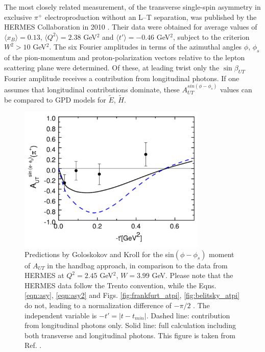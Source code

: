 The most closely related measurement, of the transverse single-spin asymmetry
in exclusive $\pi^+$ electroproduction without an L--T separation, was
published by the HERMES Collaboration in 2010 \cite{hermes10}.  Their data were
obtained for average values of $\langle x_B \rangle =0.13$, $\langle Q^2 \rangle
=2.38$ GeV$^2$ and $\langle t' \rangle = -0.46$ GeV$^2$, subject to the
criterion $W^2>10$ GeV$^2$.  The six Fourier amplitudes in terms of the
azimuthal angles $\phi$, $\phi_s$ of the pion-momentum and proton-polarization
vectors relative to the lepton scattering plane were determined.  Of these, at
leading twist only the $\sin\beta_{UT}$ Fourier amplitude receives a
contribution from longitudinal photons.  If one assumes that longitudinal
contributions dominate, these $A_{UT}^{sin(\phi-\phi_s)}$ values can be
compared to GPD models for $\tilde{E}$, $\tilde{H}$.

\begin{figure}[hbt!]
\begin{center}
\includegraphics[height=7cm]{./figures/hermes_Aut.pdf}
\end{center}
\caption{\label{fig:hermes_aut}
\footnotesize{
Predictions by Goloskokov and Kroll for the sin$(\phi-\phi_s)$ moment of
$A_{UT}$ in the handbag approach, in comparison to the data from HERMES at
$Q^2=2.45$ GeV$^2$, $W=3.99$ GeV.  Please note that the HERMES data
follow the Trento convention, while the Eqns. \ref{eqn:asy}, \ref{eqn:asy2} and
Figs. \ref{fig:frankfurt_atpi}, \ref{fig:belitsky_atpi} do not, leading to a
normalization difference of $-\pi/2$ \cite{hermes-thesis}.  The independent
variable is $-t'=|t-t_{min}|$.  Dashed line: contribution from longitudinal
photons only.  Solid line: full calculation including both transverse and
longitudinal photons.  This figure is taken from Ref. .}}
\end{figure}

